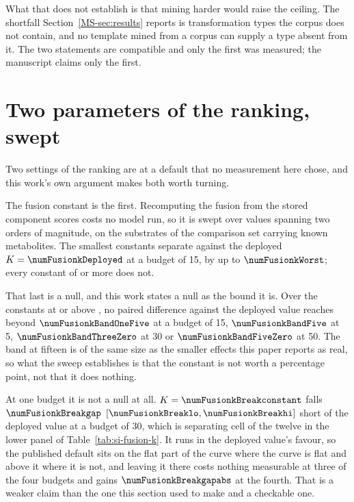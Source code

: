 \documentclass[journal=jcisd8,manuscript=suppinfo,layout=onecolumn]{achemso}
\begin{document}
What that does not establish is that mining harder would raise the ceiling. The shortfall
Section~\ref{MS-sec:results} reports is transformation types the corpus does not contain, and no
template mined from a corpus can supply a type absent from it. The two statements are
compatible and only the first was measured; the manuscript claims only the first.

\section{Two parameters of the ranking, swept}
\label{sec:si-aggregation}
\label{sec:si-knobs}

Two settings of the ranking are at a default that no measurement here chose, and this work's own
argument makes both worth turning.

The fusion constant is the first. Recomputing the fusion from the stored component scores costs no
model run, so it is swept over \numFusionkSweptWord{} values spanning two orders of magnitude, on
the \numFusionkSubstrates{} substrates of the comparison set carrying \numFusionkReferences{}
known metabolites. The \numFusionkSeparatingWord{} smallest constants separate against the deployed
$K = \numFusionkDeployed$ at a budget of 15, by up to $\numFusionkWorst$; every constant of
\numFusionkFlatfrom{} or more does not.

That last is a null, and this work states a null as the bound it is. Over
the constants at or above \numFusionkFlatfrom{}, no paired difference against the deployed value
reaches beyond $\numFusionkBandOneFive$ at a budget of 15, $\numFusionkBandFive$ at 5,
$\numFusionkBandThreeZero$ at 30 or $\numFusionkBandFiveZero$ at 50. The band at fifteen is
of the same size as the smaller effects this paper reports as real, so what the sweep establishes
is that the constant is not worth a percentage point, not that it does nothing.

At one budget it is not a null at all. $K = \numFusionkBreakconstant$ falls
$\numFusionkBreakgap$ $[\numFusionkBreaklo, \numFusionkBreakhi]$ short of the deployed value at a
budget of 30, which is \numFusionkNullbreaksWord{} separating cell of the twelve in the lower
panel of Table~\ref{tab:si-fusion-k}. It runs in the deployed value's favour, so the published
default sits on the flat part of the curve where the curve is flat and above it where it is not,
and leaving it there costs nothing measurable at three of the four budgets and gains
$\numFusionkBreakgapabs$ at the fourth. That is a weaker claim than the one this section used to
make and a checkable one.
\end{document}
